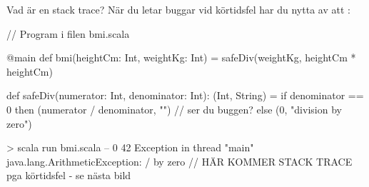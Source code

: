 




\begin{Slide}{Vad är en stack trace?}\SlideFontSmall
När du letar buggar vid körtidsfel har du nytta av att   :


  
\begin{Code}[numbers=left]
// Program i filen bmi.scala

@main 
def bmi(heightCm: Int, weightKg: Int) = 
  safeDiv(weightKg, heightCm * heightCm) 

def safeDiv(numerator: Int, denominator: Int): (Int, String) = 
  if denominator == 0 then (numerator / denominator, "")  // ser du buggen?
  else (0, "division by zero")

\end{Code}
\begin{REPL}
> scala run bmi.scala -- 0 42
Exception in thread "main" java.lang.ArithmeticException: / by zero
        // HÄR KOMMER STACK TRACE pga körtidsfel - se nästa bild
\end{REPL}
\end{Slide}

